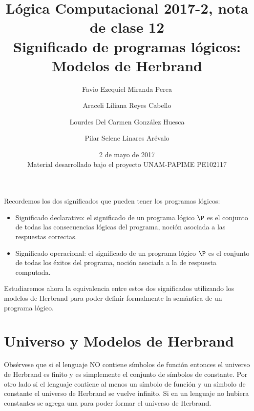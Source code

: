 \documentclass[11pt,letterpaper]{article}
\title{Lógica Computacional 2017-2, nota de clase 12\\
Significado de programas l\'ogicos: Modelos de Herbrand}
\author{Favio Ezequiel Miranda Perea \and Araceli Liliana Reyes Cabello\and
Lourdes Del Carmen Gonz\'alez Huesca \and Pilar Selene Linares Arévalo}
\date{2 de mayo de 2017 \\
Material desarrollado bajo el proyecto UNAM-PAPIME PE102117}
\begin{document}
\maketitle

\noindent 
Recordemos los dos significados que pueden tener los programas l\'ogicos:
\begin{itemize}
 \item Significado declarativo: 
  el significado de un programa l\'ogico $\P$ es el conjunto de todas 
  las consecuencias l\'ogicas del programa, noci\'on asociada a las respuestas 
  correctas.
 \item Significado operacional: 
  el significado de un programa l\'ogico $\P$ es el conjunto de todas 
  los \'exitos del programa, noci\'on asociada a la de respuesta computada.
\end{itemize}
Estudiaremos ahora la equivalencia entre estos dos significados utilizando los 
modelos de Herbrand para poder definir formalmente la sem\'antica de un programa 
l\'ogico.

\vspace*{-15pt}

\section{Universo y Modelos de Herbrand}


Obs\'ervese que si el lenguaje NO contiene s\'imbolos de funci\'on entonces el
universo de Herbrand es finito y es simplemente el conjunto de s\'imbolos de 
constante. 
Por otro lado si el lenguaje contiene al menos un s\'imbolo de funci\'on y un 
s\'imbolo de constante el universo de Herbrand se vuelve infinito. Si en un
lenguaje no hubiera constantes se agrega una para poder formar el universo de 
Herbrand.

\end{document}
